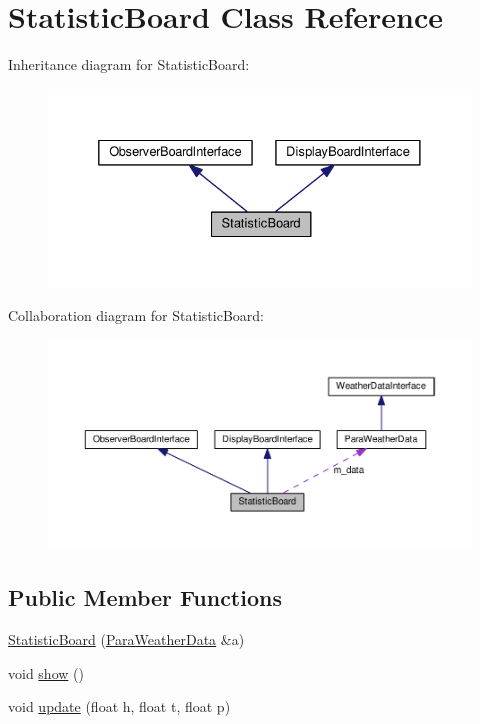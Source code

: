 \hypertarget{classStatisticBoard}{}\section{Statistic\+Board Class Reference}
\label{classStatisticBoard}


Inheritance diagram for Statistic\+Board\+:
\nopagebreak
\begin{figure}[H]
\begin{center}
\leavevmode
\includegraphics[width=332pt]{classStatisticBoard__inherit__graph}
\end{center}
\end{figure}


Collaboration diagram for Statistic\+Board\+:
\nopagebreak
\begin{figure}[H]
\begin{center}
\leavevmode
\includegraphics[width=350pt]{classStatisticBoard__coll__graph}
\end{center}
\end{figure}
\subsection*{Public Member Functions}
\begin{DoxyCompactItemize}
\item 
\hyperlink{classStatisticBoard_aec1eb00966e7d219ac20a97f0810bc93}{Statistic\+Board} (\hyperlink{classParaWeatherData}{Para\+Weather\+Data} \&a)
\item 
void \hyperlink{classStatisticBoard_a6594f0aac96b441cc8b6c1db1633df55}{show} ()
\item 
void \hyperlink{classStatisticBoard_a9798b65093467a16cd52b2b6f813dbed}{update} (float h, float t, float p)
\end{DoxyCompactItemize}
